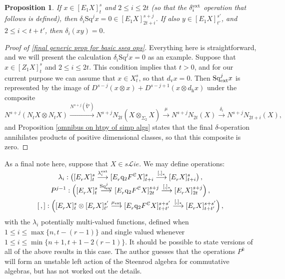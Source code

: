\documentclass[11pt]{amsart} \renewcommand{\baselinestretch}{1.2}
\theoremstyle{plain}
\newtheorem{prop}[thm]{Proposition}
\theoremstyle{definition}
\renewcommand{\to}{\longrightarrow}
\newcommand{\scrL}{\mathscr{L}}
\newcommand{\calc}{\mathcal{C}}
\newcommand{\quadgrad}[1]{\mathrm{q}_{#1}}
\newcommand{\Nabla}{\nabla}
\newcommand{\Sq}{\mathrm{Sq}}
\newcommand{\liealgs}{{\scrL\!\textit{ie}}}
\newcommand{\Edownup}[5]{[E_{#1}^{#2}#3]^{#4}_{#5}}
\newcommand{\EZdownup}[5]{[Z^{#2}_{#1}#3]^{#4}_{#5}}
\newcommand{\dver}{_\mathrm{v}}
\newcommand{\dhor}{_\mathrm{h}}
\begin{document}
\begin{second quadrant homotopy sseq operations}
\begin{prop}
If $x\in \Edownup{1}{}{X}{s}{t}$ and $2\leq i \leq 2t$ (so that the $\delta^\textup{ext}_i$ operation that follows is defined), then $\delta_i\Sq^jx=0\in \Edownup{1}{}{X}{s+j}{2t+i}$. If also $y\in \Edownup{1}{}{X}{s'}{t'}$, and $2\leq i <t+t'$, then $\delta_i(xy)=0$.
\end{prop}
\begin{proof}[Proof of \ref{final generic prop for basic sseq ops}]
Everything here is straightforward, and we will present the calculation 
$\delta_i\Sq^jx=0$ as an example.
Suppose that $x\in \EZdownup{1}{}{X}{s}{t}$ and $2\leq i\leq 2t$. This condition implies that $t>0$, and for our current purpose we can assume that $x\in X^s_t$, so that $d\dver x=0$.  Then $\Sq^j_\textup{ext}x$ is represented by the image of $D^{s-j}(x\otimes x)+D^{s-j+1}(x\otimes d\dhor x)$ under the composite
\[N^{s+j}(N_tX\otimes N_tX)\overset{N^{s+j}(\widetilde{\Nabla})}{\to}N^{s+j}N_{2t}(X\otimes_{\Sigma_2} X)\overset{\mu}{\to}N^{s+j}N_{2t}(X)\overset{\delta_i}{\to}N^{s+j}N_{2t+i}(X),\]
and Proposition \ref{omnibus on htpy of simp algs} states that the final $\delta$-operation annihilates products of positive dimensional classes, so that this composite is zero.
\end{proof}

As a final note here, suppose that $X\in s\liealgs$. We may define operations:
\begin{gather*}
\lambda_i:\left(\Edownup{r}{}{X}{s}{t} \smash{{}\overset{\lambda_i^\textup{ext}}{\to}{}} \Edownup{r}{}{\quadgrad{2}F^\calc X}{s}{t+i}\smash{{}\overset{[,]_*}{\to} {}}
\Edownup{r}{}{X}{s}{t+i}\right),
\\
P^{j-1}:\left(\Edownup{r}{}{X}{s}{t}   \smash{{}\overset{\Sq^j_\textup{ext}}{\to}{}} \Edownup{r}{}{\quadgrad{2}F^\calc X}{s+j}{2t}\smash{{}\overset{[,]_*}{\to} {}}
\Edownup{r}{}{X}{s+j}{2t}\right),\\
[\,,]:\left(\Edownup{r}{}{X}{s}{t}\otimes \Edownup{r}{}{X}{s'}{t'}\smash{{}\overset{\mu_\textup{ext}}{\to}{}} \Edownup{r}{}{\quadgrad{2}F^\calc X}{s+s'}{t+t'}\smash{{}\overset{[,]_*}{\to} {}}
\Edownup{r}{}{X}{s+s'}{t+t'}\right),
\end{gather*}
with the $\lambda_i$ potentially multi-valued functions,  defined when $1\leq i\leq \max\{n,t-(r-1)\}$ %
and single valued whenever $1\leq i\leq\min\{n+1,t+1-2(r-1)\}$.
It should be possible to state versions of all of the above results in this case. The author guesses that the operations $P^{k}$ will form an unstable left action of the Steenrod algebra for commutative algebras, but has not worked out the details.


\end{second quadrant homotopy sseq operations}
\end{document}
